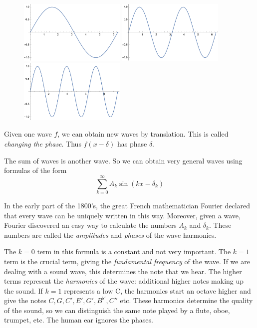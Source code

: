 \documentclass[11pt, oneside]{article}   	%
\begin{document}
\begin{figure}[htbp] %
   \centering
   \includegraphics[width=2in]{Graphics/sin1} \hspace{.5in}   \includegraphics[width=2in]{Graphics/sin2}
    \hspace{.5in}   \includegraphics[width=2in]{Graphics/sin3}
\end{figure}

Given one wave $f$, we can obtain new waves by translation. This is called {\em changing the phase}.
Thus $f(x - \delta)$ has phase $\delta$. 

The sum of  waves is another wave. So we can obtain very general waves using formulas of the form
\[\sum_{k = 0}^\infty A_k \sin(kx - \delta_k)\]

In the early part of the 1800's, the great French mathematician Fourier declared that every wave can be uniquely written in this way. Moreover, given a wave, Fourier discovered an easy way to calculate the numbers $A_k$ and $\delta_k$. These numbers are called the {\em amplitudes} and {\em phases} of the wave harmonics.


The $k = 0$ term in this formula is a constant and not very important. The $k = 1$ term is the crucial term, giving the {\em fundamental frequency} of the wave. If we are dealing with a sound wave, this determines the note that we hear. The higher terms represent the {\em harmonics} of the wave: additional higher notes making up the sound.  If $k = 1$ represents a low C, the harmonics start an octave higher and give the notes $C, G, C', E', G', B^{\flat'}, C''$ etc. These harmonics determine the quality of the sound, so we can distinguish the same note played by a flute, oboe, trumpet, etc. The human ear ignores the phases.
\end{document}
